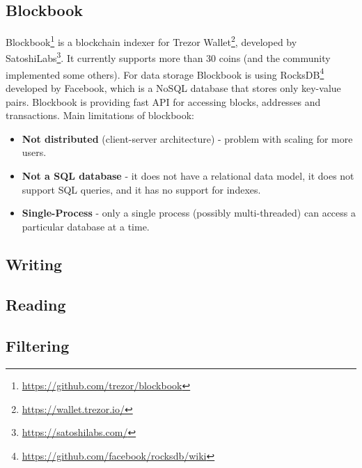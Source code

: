 \subsection{Blockbook}
Blockbook\footnote{\url{https://github.com/trezor/blockbook}} is a blockchain indexer for Trezor Wallet\footnote{\url{https://wallet.trezor.io/}}, developed by SatoshiLabs\footnote{\url{https://satoshilabs.com/}}. It currently supports more than 30 coins (and the community implemented some others). For data storage Blockbook is using RocksDB\footnote{\url{https://github.com/facebook/rocksdb/wiki}} developed by Facebook, which is a NoSQL database that stores only key-value pairs. Blockbook is providing fast API for accessing blocks, addresses and transactions. Main limitations of blockbook:
\begin{itemize}
    \item \textbf{Not distributed} (client-server architecture) - problem with scaling for more users. 
    \item \textbf{Not a SQL database} - it does not have a relational data model, it does not support SQL queries, and it has no support for indexes.
    \item \textbf{Single-Process} - only a single process (possibly multi-threaded) can access a particular database at a time.
\end{itemize}

\subsection{Writing}

\subsection{Reading}


\subsection{Filtering}